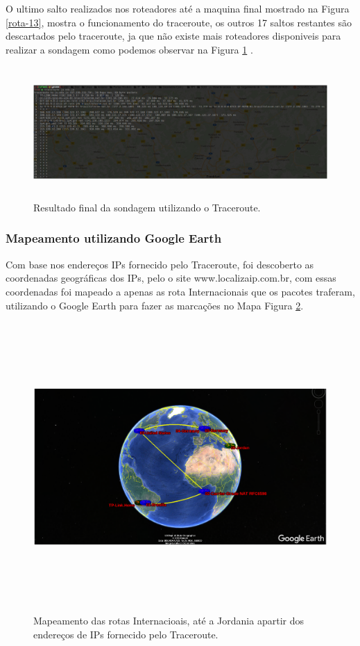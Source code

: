 \documentclass[
	article,			%
	11pt,				%
	oneside,			%
	a4paper,			%
	section=TITLE,		%
	english,			%
	brazil,				%
	sumario=tradicional
	]{abntex2}
\begin{document}
	O ultimo salto realizados nos roteadores até a maquina final mostrado na Figura \ref{rota-13}, mostra o funcionamento do traceroute, os outros 17 saltos restantes são descartados pelo traceroute, ja que não existe mais roteadores disponiveis para realizar a sondagem como podemos observar na Figura \ref{traceroute} .
\begin{figure}[H]
	\centering
	\includegraphics[width=15cm,height=5cm]{./trauceroute-1.png}
	\caption{Resultado final da sondagem utilizando o Traceroute.}
	\label{traceroute}
\end{figure}
	 

\subsubsection{Mapeamento utilizando Google Earth }
	Com base nos endereços IPs fornecido pelo Traceroute, foi descoberto as coordenadas geográficas dos IPs, pelo o site www.localizaip.com.br, com essas coordenadas foi mapeado a apenas as rota Internacionais que os pacotes traferam, utilizando o Google Earth para fazer as marcações no Mapa Figura \ref{google-earth}.
\begin{figure}[H]
	\centering
	\includegraphics[width=15cm,height=11cm]{./google-earh.png}
	\caption{Mapeamento das rotas Internacioais, até a Jordania apartir dos endereços de IPs fornecido pelo Traceroute.}
	\label{google-earth}
\end{figure}
\end{document}
